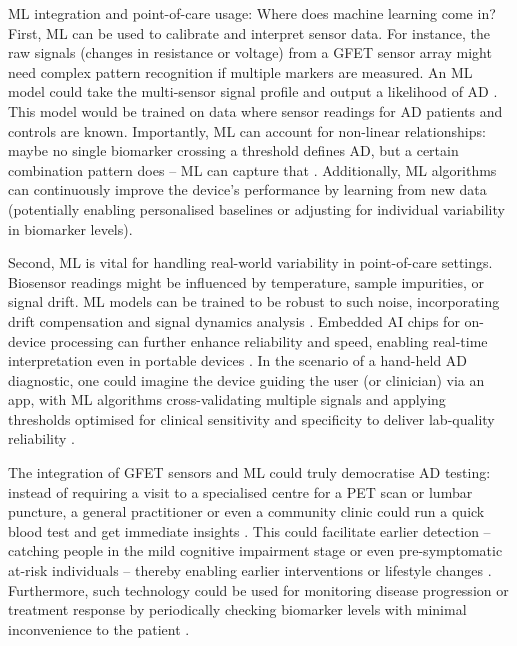 \documentclass[a4paper,12pt]{article}
\begin{document}
ML integration and point-of-care usage: Where does machine learning come in? First, ML can be used to calibrate and interpret sensor data. For instance, the raw signals (changes in resistance or voltage) from a GFET sensor array might need complex pattern recognition if multiple markers are measured. An ML model could take the multi-sensor signal profile and output a likelihood of AD \cite{bhaiyya2024role}. This model would be trained on data where sensor readings for AD patients and controls are known. Importantly, ML can account for non-linear relationships: maybe no single biomarker crossing a threshold defines AD, but a certain combination pattern does – ML can capture that \cite{wang2025machine}. Additionally, ML algorithms can continuously improve the device’s performance by learning from new data (potentially enabling personalised baselines or adjusting for individual variability in biomarker levels).

Second, ML is vital for handling real-world variability in point-of-care settings. Biosensor readings might be influenced by temperature, sample impurities, or signal drift. ML models can be trained to be robust to such noise, incorporating drift compensation and signal dynamics analysis \cite{bhaiyya2024role}. Embedded AI chips for on-device processing can further enhance reliability and speed, enabling real-time interpretation even in portable devices \cite{flynn2024artificial}. In the scenario of a hand-held AD diagnostic, one could imagine the device guiding the user (or clinician) via an app, with ML algorithms cross-validating multiple signals and applying thresholds optimised for clinical sensitivity and specificity to deliver lab-quality reliability \cite{han2025machine}.

The integration of GFET sensors and ML could truly democratise AD testing: instead of requiring a visit to a specialised centre for a PET scan or lumbar puncture, a general practitioner or even a community clinic could run a quick blood test and get immediate insights \cite{bungon2021graphene}. This could facilitate earlier detection – catching people in the mild cognitive impairment stage or even pre-symptomatic at-risk individuals – thereby enabling earlier interventions or lifestyle changes \cite{cummings2021alzheimer}. Furthermore, such technology could be used for monitoring disease progression or treatment response by periodically checking biomarker levels with minimal inconvenience to the patient \cite{hampel2018blood}.
\end{document}
